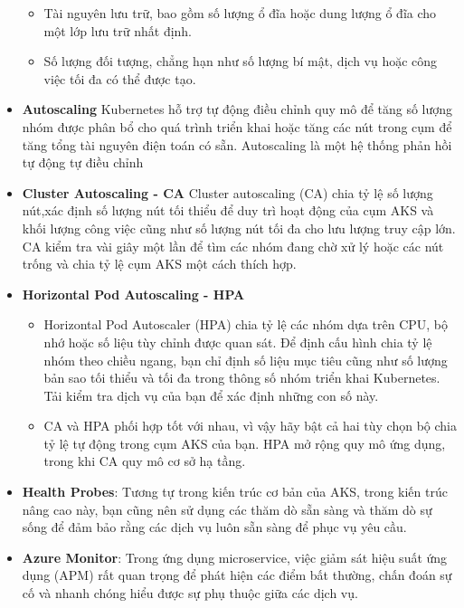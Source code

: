 \begin{itemize}
\begin{itemize}
                \item Tài nguyên lưu trữ, bao gồm số lượng ổ đĩa hoặc dung lượng ổ đĩa cho một lớp lưu trữ nhất định.
                \item Số lượng đối tượng, chẳng hạn như số lượng bí mật, dịch vụ hoặc công việc tối đa có thể được tạo.
            \end{itemize} 
        \item \textbf{Autoscaling} 
        \newline
        Kubernetes hỗ trợ tự động điều chỉnh quy mô để tăng số lượng nhóm được phân bổ cho quá trình triển khai hoặc tăng các nút trong cụm để tăng tổng tài nguyên điện toán có sẵn. Autoscaling là một hệ thống phản hồi tự động tự điều chỉnh
        \item \textbf{Cluster Autoscaling - CA}
        \newline
        Cluster autoscaling (CA) chia tỷ lệ số lượng nút,xác định số lượng nút tối thiểu để duy trì hoạt động của cụm AKS và khối lượng công việc cũng như số lượng nút tối đa cho lưu lượng truy cập lớn. CA kiểm tra vài giây một lần để tìm các nhóm đang chờ xử lý hoặc các nút trống và chia tỷ lệ cụm AKS một cách thích hợp. 
        \item \textbf{Horizontal Pod Autoscaling - HPA}
            \begin{itemize}
                \item Horizontal Pod Autoscaler (HPA) chia tỷ lệ các nhóm dựa trên CPU, bộ nhớ hoặc số liệu tùy chỉnh được quan sát. Để định cấu hình chia tỷ lệ nhóm theo chiều ngang, bạn chỉ định số liệu mục tiêu cũng như số lượng bản sao tối thiểu và tối đa trong thông số nhóm triển khai Kubernetes. Tải kiểm tra dịch vụ của bạn để xác định những con số này.
                \item CA và HPA phối hợp tốt với nhau, vì vậy hãy bật cả hai tùy chọn bộ chia tỷ lệ tự động trong cụm AKS của bạn. HPA mở rộng quy mô ứng dụng, trong khi CA quy mô cơ sở hạ tầng. 
            \end{itemize}
        \item \textbf{Health Probes}: Tương tự trong kiến trúc cơ bản của AKS, trong kiến trúc nâng cao này, bạn cũng nên sử dụng các thăm dò sẵn sàng và thăm dò sự sống để đảm bảo rằng các dịch vụ luôn sẵn sàng để phục vụ yêu cầu.
        \item \textbf{Azure Monitor}: Trong ứng dụng microservice, việc giảm sát hiệu suất ứng dụng (APM) rất quan trọng để phát hiện các điểm bất thường, chấn đoán sự cố và nhanh chóng hiểu được sự phụ thuộc giữa các dịch vụ.

\end{itemize}

